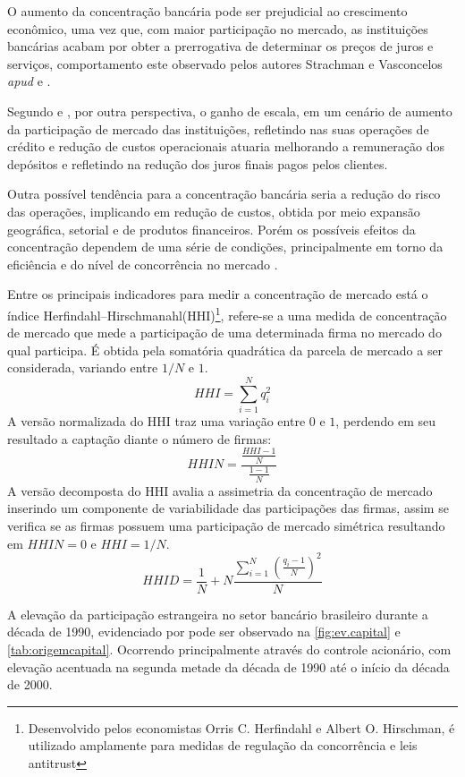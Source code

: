 \documentclass[12pt,12pt,openright,oneside,a4paper,chapter=TITLE,section=TITLE,subsection=TITLE,subsubsection=TITLE,english,french,spanish,portugues,sumario=tradicional]{abntex2}
\begin{document}
O aumento da concentração bancária pode ser prejudicial ao crescimento econômico, uma vez que, com maior participação no mercado, as instituições bancárias acabam por obter a prerrogativa de determinar os preços de juros e serviços, comportamento este observado pelos autores Strachman e Vasconcelos \emph{apud} \textcite{camargo:2009} e \textcite{klein:1971}.

Segundo \textcite{camargo:2009} e \textcite{dantas:2012}, por outra perspectiva, o ganho de escala, em um cenário de aumento da participação de mercado das instituições, refletindo nas suas operações de crédito e redução de custos operacionais atuaria melhorando a remuneração dos depósitos e refletindo na redução dos juros finais pagos pelos clientes.

Outra possível tendência para a concentração bancária seria a redução do risco
das operações, implicando em redução de custos, obtida por meio expansão
geográfica, setorial e de produtos financeiros. Porém os possíveis efeitos da
concentração dependem de uma série de condições, principalmente em torno da
eficiência e do nível de concorrência no mercado \cite{camargo:2009}.

Entre os principais indicadores para medir a concentração de mercado está o índice Herfindahl--Hirschmanahl(HHI)\footnote{Desenvolvido pelos economistas Orris C. Herfindahl e Albert O. Hirschman, é utilizado amplamente para medidas de regulação da concorrência e leis antitrust}, refere-se a uma medida de concentração de mercado que mede a participação de uma determinada firma no mercado do qual participa. É obtida pela somatória quadrática da parcela de mercado a ser considerada, variando entre \(1/N\) e \(1\).
\[
HHI = \sum_{i=1}^{N}q_i^2
\]
A versão normalizada do HHI traz uma variação entre \(0\) e \(1\), perdendo em seu resultado a captação diante o número de firmas:
\[
HHIN = \frac{\frac{HHI - 1}{N}}{\frac{1-1}{N}}
\]
A versão decomposta do HHI avalia a assimetria da concentração de mercado inserindo um componente de variabilidade das participações das firmas, assim se verifica se as firmas possuem uma participação de mercado simétrica resultando em \(HHIN = 0\) e \(HHI= 1/N\).
\[
HHID = \frac{1}{N} + N\frac{\sum_{i=1}^{N}(\frac{q_i - 1}{N})^2}{N}
\]

A elevação da participação estrangeira no setor bancário brasileiro durante a década de 1990, evidenciado por \textcite{camargo:2009} pode ser observado na \autoref{fig:ev.capital} e \autoref{tab:origemcapital}. Ocorrendo principalmente através do controle acionário, com elevação acentuada na segunda metade da década de 1990 até o início da década de 2000.
\end{document}
